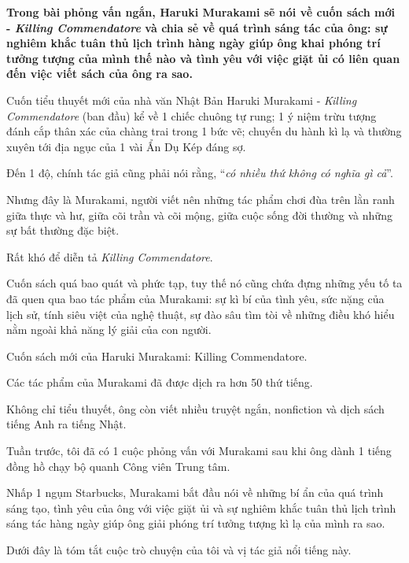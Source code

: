 \documentclass{article}
\begin{document}
\textbf{Trong bài phỏng vấn ngắn, Haruki Murakami sẽ nói về cuốn sách mới - \textit{Killing Commendatore} và chia sẻ về quá trình sáng tác của ông: sự nghiêm khắc tuân thủ lịch trình hàng ngày giúp ông khai phóng trí tưởng tượng của mình thế nào và tình yêu với việc giặt ủi có liên quan đến việc viết sách của ông ra sao.}

%
Cuốn tiểu thuyết mới của nhà văn Nhật Bản Haruki Murakami - \textit{Killing Commendatore} (ban đầu) kể về 1 chiếc chuông tự rung; 1 ý niệm trừu tượng đánh cắp thân xác của chàng trai trong 1 bức vẽ; chuyến du hành kì lạ và thường xuyên tới địa ngục của 1 vài Ẩn Dụ Kép đáng sợ.

Đến 1 độ, chính tác giả cũng phải nói rằng, ``\textit{có nhiều thứ không có nghĩa gì cả}''.

%
Nhưng đây là Murakami, người viết nên những tác phẩm chơi đùa trên lằn ranh giữa thực và hư, giữa cõi trần và cõi mộng, giữa cuộc sống đời thường và những sự bất thường đặc biệt.

Rất khó để diễn tả \textit{Killing Commendatore}.

Cuốn sách quá bao quát và phức tạp, tuy thế nó cũng chứa đựng những yếu tố ta đã quen qua bao tác phẩm của Murakami: sự kì bí của tình yêu, sức nặng của lịch sử, tính siêu việt của nghệ thuật, sự đào sâu tìm tòi về những điều khó hiểu nằm ngoài khả năng lý giải của con người.

\textsf{Cuốn sách mới của Haruki Murakami: Killing Commendatore.}

Các tác phẩm của Murakami đã được dịch ra hơn 50 thứ tiếng.

Không chỉ tiểu thuyết, ông còn viết nhiều truyệt ngắn, nonfiction và dịch sách tiếng Anh ra tiếng Nhật.

Tuần trước, tôi đã có 1 cuộc phỏng vấn với Murakami sau khi ông dành 1 tiếng đồng hồ chạy bộ quanh Công viên Trung tâm.

Nhấp 1 ngụm Starbucks, Murakami bắt đầu nói về những bí ẩn của quá trình sáng tạo, tình yêu của ông với việc giặt ủi và sự nghiêm khắc tuân thủ lịch trình sáng tác hàng ngày giúp ông giải phóng trí tưởng tượng kì lạ của mình ra sao.

Dưới đây là tóm tắt cuộc trò chuyện của tôi và vị tác giả nổi tiếng này.
\end{document}
